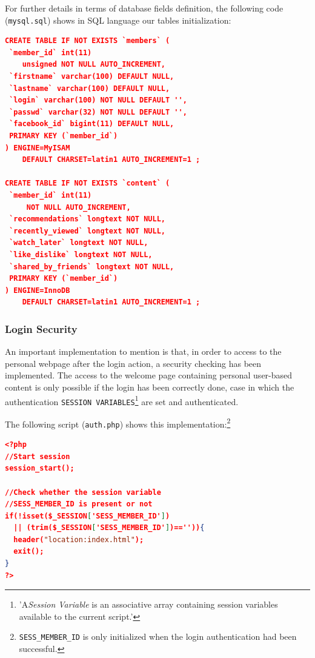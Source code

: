 \documentclass{acm_proc_article-sp}
\begin{document}
For further details in terms of database fields definition, the following code (\texttt{mysql.sql}) shows in SQL language our tables initialization: 

\begin{lstlisting}[language=json,firstnumber=1]
CREATE TABLE IF NOT EXISTS `members` (
 `member_id` int(11) 
    unsigned NOT NULL AUTO_INCREMENT,
 `firstname` varchar(100) DEFAULT NULL,
 `lastname` varchar(100) DEFAULT NULL,
 `login` varchar(100) NOT NULL DEFAULT '',
 `passwd` varchar(32) NOT NULL DEFAULT '',
 `facebook_id` bigint(11) DEFAULT NULL,
 PRIMARY KEY (`member_id`)
) ENGINE=MyISAM  
    DEFAULT CHARSET=latin1 AUTO_INCREMENT=1 ;

CREATE TABLE IF NOT EXISTS `content` (
 `member_id` int(11) 
     NOT NULL AUTO_INCREMENT,
 `recommendations` longtext NOT NULL,
 `recently_viewed` longtext NOT NULL,
 `watch_later` longtext NOT NULL,
 `like_dislike` longtext NOT NULL,
 `shared_by_friends` longtext NOT NULL,
 PRIMARY KEY (`member_id`)
) ENGINE=InnoDB  
    DEFAULT CHARSET=latin1 AUTO_INCREMENT=1 ;
\end{lstlisting}

\subsubsection{Login Security}

An important implementation to mention is that, in order to access to the personal webpage after the login action, a security checking has been implemented. The access to the welcome page containing personal user-based content is only possible if the login has been correctly done, case in which the authentication \texttt{SESSION VARIABLES}\cite{php:session}\footnote{'A\textit{Session Variable} is an associative array containing session variables available to the current script.'} are set and authenticated. 

The following script (\texttt{auth.php}) shows this implementation:\footnote{\texttt{SESS\_MEMBER\_ID} is only initialized when the login authentication had been successful.}

\begin{lstlisting}[language=json,firstnumber=1]
<?php
//Start session
session_start();
	
//Check whether the session variable 
//SESS_MEMBER_ID is present or not
if(!isset($_SESSION['SESS_MEMBER_ID']) 
  || (trim($_SESSION['SESS_MEMBER_ID'])=='')){
  header("location:index.html");
  exit();
}
?>
\end{lstlisting}
\end{document}
